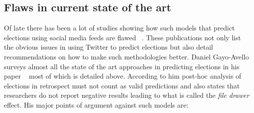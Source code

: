 \subsection{Flaws in current state of the art}
Of late there has been a lot of studies showing how such models that predict elections using social media feeds are flawed ~\cite{metaxas2011not,gayo2012wanted,gayo2011don,gayo2011limits}.
These publications not only list the obvious issues in using Twitter to predict elections but also detail recommendations on how to make such methodologies better.
Daniel Gayo-Avello surveys almost all the state of the art approaches in predicting elections in his paper ~\cite{gayo2012wanted} most of which is detailed above.
According to him post-hoc analysis of elections in retrospect must not count as valid predictions and also states that researchers do not report negative results leading to what is called the \emph{file drawer} effect. 
His major points of argument against such models are:
